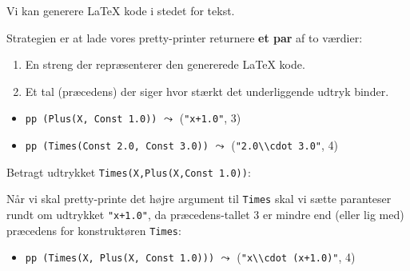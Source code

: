 \documentclass[rgb]{beamer}
\begin{document}
\begin{frame}[fragile]
\begin{footnotesize}

  Vi kan generere \LaTeX{} kode i stedet for tekst.
  \vspace{1ex}

  Strategien er at lade vores pretty-printer returnere \textbf{et par} af
  to værdier:
  \begin{enumerate}
  \item En streng der repræsenterer den genererede \LaTeX{} kode.
  \item Et tal (præcedens) der siger hvor stærkt det underliggende udtryk binder.
  \end{enumerate}


  \begin{itemize}
    \item \lstinline{pp (Plus(X, Const 1.0))} $\leadsto$ (\lstinline{"x+1.0"}, 3)
    \item \lstinline{pp (Times(Const 2.0, Const 3.0))} $\leadsto$ (\lstinline{"2.0\\cdot 3.0"}, 4)
  \end{itemize}

  Betragt udtrykket \lstinline{Times(X,Plus(X,Const 1.0))}:

  \vspace{1ex}

  Når vi skal pretty-printe det højre argument til \lstinline{Times}
  skal vi sætte paranteser rundt om udtrykket
  \lstinline{"x+1.0"}, da præcedens-tallet 3 er mindre end (eller lig med) præcedens
  for konstruktøren \lstinline{Times}:

    \begin{itemize}
    \item \lstinline{pp (Times(X, Plus(X, Const 1.0)))} $\leadsto$ (\lstinline{"x\\cdot (x+1.0)"}, 4)
  \end{itemize}

\end{footnotesize}
\end{frame}
\end{document}
